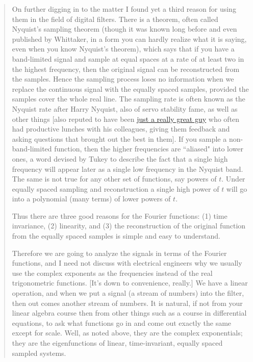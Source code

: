 \documentclass[10pt]{article}
\begin{document}
{\begin{quotation}
On further digging in to the matter I found yet a third reason for using them in the field of digital filters. There is a theorem, often called Nyquist's sampling theorem (though it was known long before and even published by Whittaker, in a form you can hardly realize what it is saying, even when you know Nyquist's theorem), which says that if you have a band-limited signal and sample at equal spaces at a rate of at least two in the highest frequency, then the original signal can be reconstructed from the samples. Hence the sampling process loses no information when we replace the continuous signal with the equally spaced samples, provided the samples cover the whole real line. The sampling rate is often known as the Nyquist rate after Harry Nyquist, also of servo stability fame, as well as other things [also reputed to have been \href{https://deanebarker.net/tech/linkedin/harry-nyquist-again/}{just a really great guy} who often had productive lunches with his colleagues, giving them feedback and asking questions that brought out the best in them]. If you sample a non-band-limited function, then the higher frequencies are ``aliased" into lower ones, a word devised by Tukey to describe the fact that a single high frequency will appear later as a single low frequency in the Nyquist band. The same is not true for any other set of functions, say powers of $t$. Under equally spaced sampling and reconstruction a single high power of $t$ will go into a polynomial (many terms) of lower powers of $t$.

Thus there are three good reasons for the Fourier functions: (1) time invariance, (2) linearity, and (3) the reconstruction of the original function from the equally spaced samples is simple and easy to understand.

Therefore we are going to analyze the signals in terms of the Fourier functions, and I need not discuss with electrical engineers why we usually use the complex exponents as the frequencies instead of the real trigonometric functions. [It's down to convenience, really.] We have a linear operation, and when we put a signal (a stream of numbers) into the filter, then out comes another stream of numbers. It is natural, if not from your linear algebra course then from other things such as a course in differential equations, to ask what functions go in and come out exactly the same except for scale. Well, as noted above, they are the complex exponentials; they are the eigenfunctions of linear, time-invariant, equally spaced sampled systems.


\end{quotation}}
\end{document}
